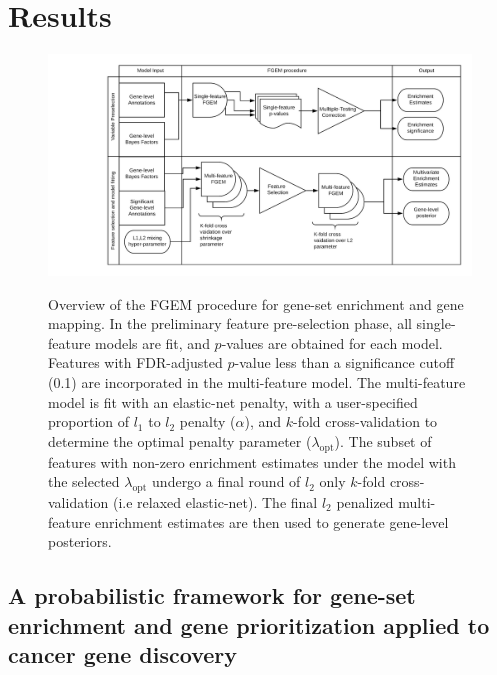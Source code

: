 \section{Results}\label{sec:org6fb4837}

\begin{figure}[h]
  \centering
  \includegraphics[width=.9\linewidth]{img/FGEM_procedure.png}
  \label{fig:overview}
  \caption{Overview of the FGEM procedure for gene-set enrichment and gene mapping.  In the preliminary feature pre-selection phase, all single-feature models are fit, and $p$-values are obtained for each model.
    Features with FDR-adjusted $p$-value less than a significance cutoff (0.1) are incorporated in the multi-feature model. The multi-feature model is fit with an elastic-net penalty, with a user-specified proportion of $l_1$
    to $l_2$ penalty ($\alpha$), and $k$-fold cross-validation to determine the optimal penalty parameter ($\lambda_{\text{opt}}$).  The subset of features with non-zero enrichment estimates under the model with the selected $\lambda_{\text{opt}}$ undergo a final round of $l_2$ only $k$-fold cross-validation (i.e relaxed elastic-net).  The final $l_2$ penalized multi-feature enrichment estimates are then used to generate gene-level posteriors. }
\end{figure}


\subsection{A probabilistic framework for gene-set enrichment and gene prioritization applied to cancer gene discovery}\label{sec:org2d4ff20}

